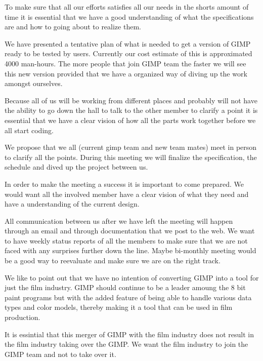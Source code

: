 To make sure that all our efforts satisfies all our needs in the shorts amount of time it is essential that we have a good understanding of what the specifications are and how to going about to realize them. 

We have presented a tentative plan of what is needed to get a version of GIMP ready to be tested by users. Currently our cost estimate of this is approximated 4000 man-hours. The more people that join GIMP team the faster we will see this new version provided that we have a organized way of diving up the work amongst ourselves.

Because all of us will be working from different places and probably will not have the ability to go down the hall to talk to the other member to clarify a point it is essential that we have a clear vision of how all the parts work together before we all start coding.

We propose that we all (current gimp team and new team mates) meet in person to clarify all the points. During this meeting we will finalize the specification, the schedule and dived up the project between us.

In order to make the meeting a success it is important to come prepared. We would want all the involved member have a clear vision of what they need and have a understanding of the current design. 

All communication between us after we have left the meeting will happen through an email and through documentation that we post to the web. We want to have weekly status reports of all the members to make sure that we are not faced with any surprises further down the line. Maybe bi-monthly meeting would be a good way to reevaluate and make sure we are on the right track.

We like to point out that we have no intention of converting GIMP into a tool for just the film industry. GIMP should continue to be a leader amoung the 8 bit paint programs but with the added feature of being able to handle various data types and color models, thereby making it a tool that can be used in film production.



 

It is essintial that this merger of GIMP with the film industry does not result in the film industry taking over the GIMP. We want the film industry to join the GIMP team and not to take over it.
 
 




